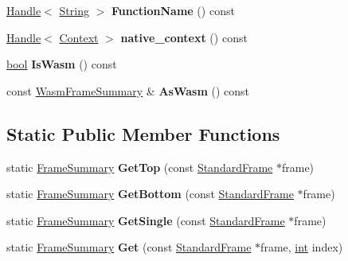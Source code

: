 \begin{DoxyCompactItemize}
\mbox{\hyperlink{classv8_1_1internal_1_1Handle}{Handle}}$<$ \mbox{\hyperlink{classv8_1_1internal_1_1String}{String}} $>$ {\bfseries Function\+Name} () const
\item 
\mbox{\label{classv8_1_1internal_1_1FrameSummary_a05002e76e88acbc4cb73d6d5ec8f6b71}} 
\mbox{\hyperlink{classv8_1_1internal_1_1Handle}{Handle}}$<$ \mbox{\hyperlink{classv8_1_1internal_1_1Context}{Context}} $>$ {\bfseries native\+\_\+context} () const
\item 
\mbox{\label{classv8_1_1internal_1_1FrameSummary_a4e366c085ed7c085679b22b97dbfa6ae}} 
\mbox{\hyperlink{classbool}{bool}} {\bfseries Is\+Wasm} () const
\item 
\mbox{\label{classv8_1_1internal_1_1FrameSummary_afeefc40a98ccb9b6235a4df325e01d5f}} 
const \mbox{\hyperlink{classv8_1_1internal_1_1FrameSummary_1_1WasmFrameSummary}{Wasm\+Frame\+Summary}} \& {\bfseries As\+Wasm} () const
\end{DoxyCompactItemize}
\subsection*{Static Public Member Functions}
\begin{DoxyCompactItemize}
\item 
\mbox{\label{classv8_1_1internal_1_1FrameSummary_a526aeb777f3f47aa6e23233aeb12346c}} 
static \mbox{\hyperlink{classv8_1_1internal_1_1FrameSummary}{Frame\+Summary}} {\bfseries Get\+Top} (const \mbox{\hyperlink{classv8_1_1internal_1_1StandardFrame}{Standard\+Frame}} $\ast$frame)
\item 
\mbox{\label{classv8_1_1internal_1_1FrameSummary_afc971d38135f2ca24cf432bc14b85c9e}} 
static \mbox{\hyperlink{classv8_1_1internal_1_1FrameSummary}{Frame\+Summary}} {\bfseries Get\+Bottom} (const \mbox{\hyperlink{classv8_1_1internal_1_1StandardFrame}{Standard\+Frame}} $\ast$frame)
\item 
\mbox{\label{classv8_1_1internal_1_1FrameSummary_a12a811d6618af10b56219e8f5aae6329}} 
static \mbox{\hyperlink{classv8_1_1internal_1_1FrameSummary}{Frame\+Summary}} {\bfseries Get\+Single} (const \mbox{\hyperlink{classv8_1_1internal_1_1StandardFrame}{Standard\+Frame}} $\ast$frame)
\item 
\mbox{\label{classv8_1_1internal_1_1FrameSummary_a9b736398a9ab613a0070959053b886cd}} 
static \mbox{\hyperlink{classv8_1_1internal_1_1FrameSummary}{Frame\+Summary}} {\bfseries Get} (const \mbox{\hyperlink{classv8_1_1internal_1_1StandardFrame}{Standard\+Frame}} $\ast$frame, \mbox{\hyperlink{classint}{int}} index)
\end{DoxyCompactItemize}



